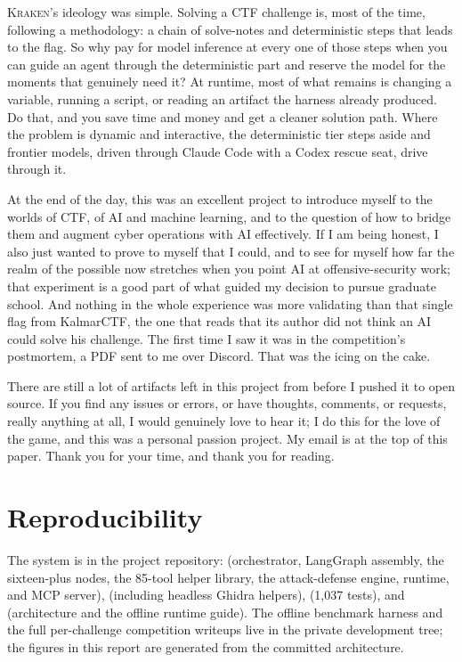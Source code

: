 \documentclass[10pt,twocolumn]{article}
\newcommand{\kraken}{\textsc{Kraken}}
\newcommand{\code}[1]{\seqsplit{\texttt{#1}}}
\begin{document}
\kraken{}'s ideology was simple. Solving a CTF challenge is, most of the time, following a methodology: a chain
of solve-notes and deterministic steps that leads to the flag. So why pay for model inference at every one of
those steps when you can guide an agent through the deterministic part and reserve the model for the moments
that genuinely need it? At runtime, most of what remains is changing a variable, running a script, or reading an
artifact the harness already produced. Do that, and you save time and money and get a cleaner solution path.
Where the problem is dynamic and interactive, the deterministic tier steps aside and frontier models, driven
through Claude Code with a Codex rescue seat, drive through it.

At the end of the day, this was an excellent project to introduce myself to the worlds of CTF, of AI and
machine learning, and to the question of how to bridge them and augment cyber operations with AI effectively.
If I am being honest, I also just wanted to prove to myself that I could, and to see for myself how far the
realm of the possible now stretches when you point AI at offensive-security work; that experiment is a good
part of what guided my decision to pursue graduate school. And nothing in the whole experience was more
validating than that single flag from KalmarCTF, the one that reads that its author did not think an AI could
solve his challenge. The first time I saw it was in the competition's postmortem, a PDF sent to me over
Discord. That was the icing on the cake.

There are still a lot of artifacts left in this project from before I pushed it to open source. If you find any
issues or errors, or have thoughts, comments, or requests, really anything at all, I would genuinely love to
hear it; I do this for the love of the game, and this was a personal passion project. My email is at the top of
this paper. Thank you for your time, and thank you for reading.

\section*{Reproducibility}

The system is in the project repository: \code{src/kraken/} (orchestrator, LangGraph assembly, the sixteen-plus
nodes, the 85-tool helper library, the attack-defense engine, runtime, and MCP server), \code{scripts/}
(including headless Ghidra helpers), \code{tests/} (1{,}037 tests), and \code{docs/} (architecture and the
offline runtime guide). The offline benchmark harness and the full per-challenge competition writeups live in
the private development tree; the figures in this report are generated from the committed architecture.
\end{document}
